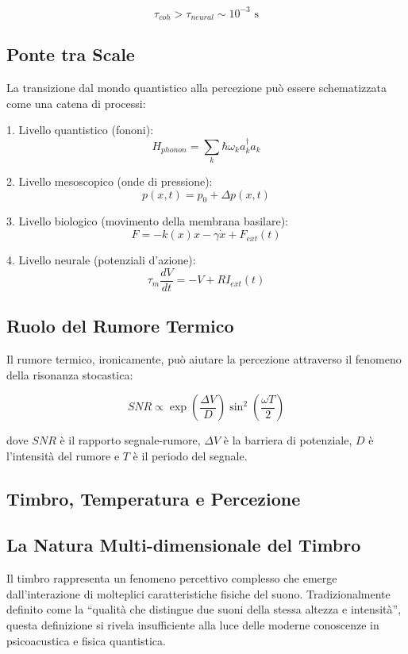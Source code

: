 \documentclass[a4paper,11pt]{article}
\begin{document}
\[\tau_{coh} > \tau_{neural} \sim 10^{-3} \text{ s}\]

\subsection{Ponte tra Scale}\label{ponte-tra-scale}

La transizione dal mondo quantistico alla percezione può essere
schematizzata come una catena di processi:

1. Livello quantistico (fononi):
\[H_{phonon} = \sum_k \hbar\omega_k a_k^\dagger a_k\]

2. Livello mesoscopico (onde di pressione):
\[p(x,t) = p_0 + \Delta p(x,t)\]

3. Livello biologico (movimento della membrana basilare):
\[F = -k(x)x - \gamma\dot{x} + F_{ext}(t)\]

4. Livello neurale (potenziali d'azione):
\[\tau_m\frac{dV}{dt} = -V + RI_{ext}(t)\]

\subsection{Ruolo del Rumore Termico}\label{ruolo-del-rumore-termico}

Il rumore termico, ironicamente, può aiutare la percezione attraverso il
fenomeno della risonanza stocastica:

\[SNR \propto \exp\left(\frac{\Delta V}{D}\right)\sin^2\left(\frac{\omega T}{2}\right)\]

dove \(SNR\) è il rapporto segnale-rumore, \(\Delta V\) è la barriera di
potenziale, \(D\) è l'intensità del rumore e \(T\) è il periodo del
segnale.

\subsection{Timbro, Temperatura e
Percezione}\label{timbro-temperatura-e-percezione}

\subsection{La Natura Multi-dimensionale del
Timbro}\label{la-natura-multi-dimensionale-del-timbro}

Il timbro rappresenta un fenomeno percettivo complesso che emerge
dall'interazione di molteplici caratteristiche fisiche del suono.
Tradizionalmente definito come la ``qualità che distingue due suoni
della stessa altezza e intensità'', questa definizione si rivela
insufficiente alla luce delle moderne conoscenze in psicoacustica e
fisica quantistica.
\end{document}
